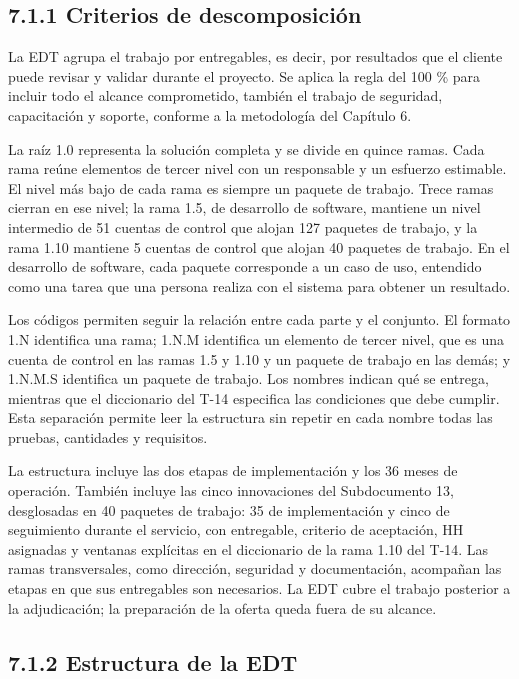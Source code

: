 \documentclass[11pt]{article}
\begin{document}
\subsection{7.1.1 Criterios de descomposición}

La EDT agrupa el trabajo por entregables, es decir, por resultados que el cliente puede revisar y validar durante el proyecto. Se aplica la regla del 100 \% para incluir todo el alcance comprometido, también el trabajo de seguridad, capacitación y soporte, conforme a la metodología del Capítulo 6.

La raíz 1.0 representa la solución completa y se divide en quince ramas. Cada rama reúne elementos de tercer nivel con un responsable y un esfuerzo estimable. El nivel más bajo de cada rama es siempre un paquete de trabajo. Trece ramas cierran en ese nivel; la rama 1.5, de desarrollo de software, mantiene un nivel intermedio de 51 cuentas de control que alojan 127 paquetes de trabajo, y la rama 1.10 mantiene 5 cuentas de control que alojan 40 paquetes de trabajo. En el desarrollo de software, cada paquete corresponde a un caso de uso, entendido como una tarea que una persona realiza con el sistema para obtener un resultado.

Los códigos permiten seguir la relación entre cada parte y el conjunto. El formato 1.N identifica una rama; 1.N.M identifica un elemento de tercer nivel, que es una cuenta de control en las ramas 1.5 y 1.10 y un paquete de trabajo en las demás; y 1.N.M.S identifica un paquete de trabajo. Los nombres indican qué se entrega, mientras que el diccionario del T-14 especifica las condiciones que debe cumplir. Esta separación permite leer la estructura sin repetir en cada nombre todas las pruebas, cantidades y requisitos.

La estructura incluye las dos etapas de implementación y los 36 meses de operación. También incluye las cinco innovaciones del Subdocumento 13, desglosadas en 40 paquetes de trabajo: 35 de implementación y cinco de seguimiento durante el servicio, con entregable, criterio de aceptación, HH asignadas y ventanas explícitas en el diccionario de la rama 1.10 del T-14. Las ramas transversales, como dirección, seguridad y documentación, acompañan las etapas en que sus entregables son necesarios. La EDT cubre el trabajo posterior a la adjudicación; la preparación de la oferta queda fuera de su alcance.

\subsection{7.1.2 Estructura de la EDT}
\end{document}
